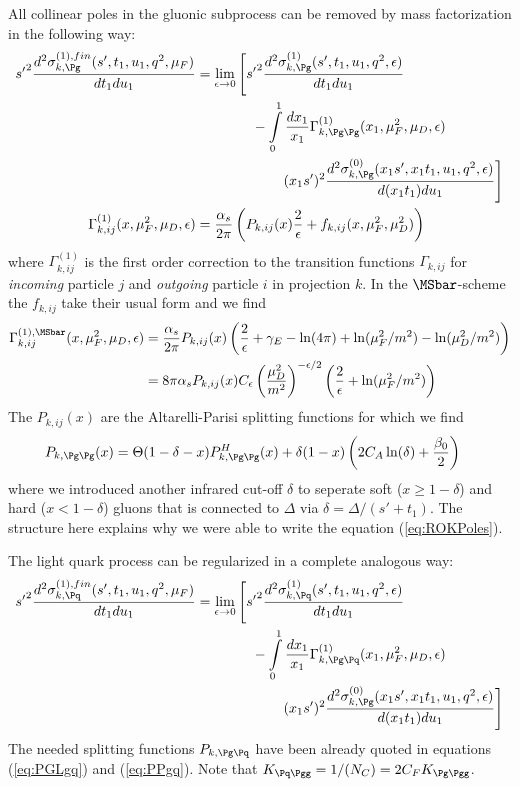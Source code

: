 All collinear poles in the gluonic subprocess can be removed by mass factorization in the following way:
\begin{align}
{s'}^2\frac{d^2\sigma_{k,\Pg}^{(1),fin}(s',t_1,u_1,q^2,\mu_F)}{dt_1du_1} &= \lim_{\epsilon\rightarrow 0}\left[{s'}^2\frac{d^2\sigma_{k,\Pg}^{(1)}(s',t_1,u_1,q^2,\epsilon)}{dt_1du_1} \right.\nonumber\\
 &\hspace{40pt} -\int\limits_0^1\frac{dx_1}{x_1}\Gamma_{k,\Pg\Pg}^{(1)}(x_1,\mu_F^2,\mu_D,\epsilon)\\
 &\hspace{60pt}\left.(x_1s')^2\frac{d^2\sigma_{k,\Pg}^{(0)}(x_1s',x_1t_1,u_1,q^2,\epsilon)}{d(x_1t_1)du_1} \right]\\
\Gamma_{k,ij}^{(1)}(x,\mu_F^2,\mu_D,\epsilon) &= \frac{\alpha_s}{2\pi}\left(P_{k,ij}(x)\frac{2}{\epsilon} + f_{k,ij}(x,\mu_F^2,\mu_D^2)\right)
\end{align}
where $\Gamma_{k,ij}^{(1)}$ is the first order correction to the transition functions $\Gamma_{k,ij}$ for \textit{incoming} particle $j$ and \textit{outgoing} particle $i$ in projection $k$. In the $\MSbar$-scheme the $f_{k,ij}$ take their usual form and we find
\begin{align}
\Gamma_{k,ij}^{(1),\MSbar}(x,\mu_F^2,\mu_D,\epsilon) &= \frac{\alpha_s}{2\pi}P_{k,ij}(x)\left(\frac{2}{\epsilon} +\gamma_E - \ln(4\pi) + \ln(\mu_F^2/m^2) - \ln(\mu_D^2/m^2)\right)\\
 &= 8\pi\alpha_s P_{k,ij}(x) C_\epsilon \left(\frac{\mu_D^2}{m^2}\right)^{-\epsilon/2} \left(\frac{2}{\epsilon} + \ln(\mu_F^2/m^2)\right)
\end{align}
The $P_{k,ij}(x)$ are the Altarelli-Parisi splitting functions for which we find\cite{Altarelli:1977zs,Vogelsang:1995vh}
\begin{align}
P_{k,\Pg\Pg}(x) &= \Theta(1-\delta-x)P_{k,\Pg\Pg}^H(x)+\delta(1-x)\left(2C_A\ln(\delta)+\frac{\beta_0}{2}\right)
\end{align}
where we introduced another infrared cut-off $\delta$ to seperate soft ($x\geq 1-\delta$) and hard ($x<1-\delta$) gluons that is connected to $\Delta$ via $\delta=\Delta/(s'+t_1)$. The structure here explains why we were able to write the equation (\ref{eq:ROKPoles}).

The light quark process can be regularized in a complete analogous way:
\begin{align}
{s'}^2\frac{d^2\sigma_{k,\Pq}^{(1),fin}(s',t_1,u_1,q^2,\mu_F)}{dt_1du_1} &= \lim_{\epsilon\rightarrow 0}\left[{s'}^2\frac{d^2\sigma_{k,\Pq}^{(1)}(s',t_1,u_1,q^2,\epsilon)}{dt_1du_1} \right.\nonumber\\
 &\hspace{40pt}-\int\limits_0^1\frac{dx_1}{x_1}\Gamma_{k,\Pg\Pq}^{(1)}(x_1,\mu_F^2,\mu_D,\epsilon)\nonumber\\
 &\hspace{60pt}\left.(x_1s')^2\frac{d^2\sigma_{k,\Pg}^{(0)}(x_1s',x_1t_1,u_1,q^2,\epsilon)}{d(x_1t_1)du_1} \right] \label{eq:qMassFact}
\end{align}
The needed splitting functions $P_{k,\Pg\Pq}$ have been already quoted in equations (\ref{eq:PGLgq}) and (\ref{eq:PPgq}). Note that $K_{\Pq\Pgg} = 1/(N_C) = 2C_FK_{\Pg\Pgg}$.

